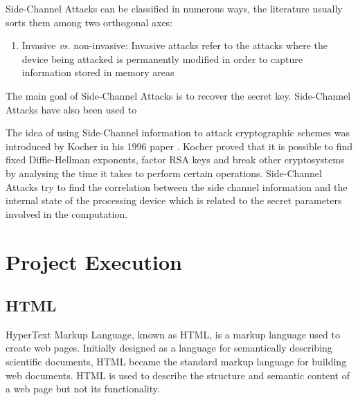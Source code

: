 \documentclass[10pt,a4paper,twoside]{book}
\begin{document}
Side-Channel Attacks can be classified in numerous ways, the literature usually sorts them among two orthogonal axes:
\begin{enumerate}
\item Invasive \textit{vs.} non-invasive: Invasive attacks refer to the attacks where the device being attacked is permanently modified in order to capture information stored in memory areas 
\end{enumerate}

The main goal of Side-Channel Attacks is to recover the secret key. Side-Channel Attacks have also been used to 

The idea of using Side-Channel information to attack cryptographic schemes was introduced by Kocher in his 1996 paper \cite{kocher1996timing}. Kocher proved that it is possible to find fixed Diffie-Hellman exponents, factor RSA keys and break other cryptosystems by analysing the time it takes to perform certain operations. Side-Channel Attacks try to find the correlation between the side channel information and the internal state of the processing device which is related to the secret parameters involved in the computation.








\chapter{Project Execution}
\label{chap:execution}


\section{HTML}
HyperText Markup Language, known as HTML, is a markup language used to create web pages. Initially designed as a language for semantically describing scientific documents, HTML became the standard markup language for building web documents. HTML is used to describe the structure and semantic content of a web page but not its functionality.\cite{world1999html}
\end{document}
